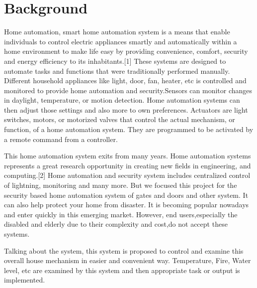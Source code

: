\documentclass[12pt,a4paper]{report}
\begin{document}
	\section{Background}
	
	\begin{justify}
		Home automation, smart home automation system is a means that enable individuals to control electric appliances smartly and automatically within a home environment to make life easy by providing convenience, comfort, security  and energy efficiency to its inhabitants.[1]   These systems are designed to automate tasks and functions that were traditionally performed manually. Different household appliances like light, door, fan, heater, etc is controlled and monitored to provide home automation and security.Sensors can monitor changes in daylight, temperature, or motion detection. Home automation systems can then adjust those settings and also more to own preferences. Actuators are light switches, motors, or motorized valves that control the actual mechanism, or function, of a home automation system. They are programmed to be activated by a remote command from a controller.
	\end{justify}
	\begin{justify}
		This home automation system exits from many years. Home automation systems represents a great research opportunity in creating new fields in engineering, and computing.[2] Home automation and security system includes centralized control of lightning, monitoring and many more. But we focused this project for the security based home automation system of gates and doors and other system. It can also help protect your home from disaster. It is becoming popular nowadays and enter quickly in this emerging market. However, end users,especially the disabled and elderly due to their complexity and cost,do not accept these systems.
		
	\end{justify}
	
	\begin{justify}
		Talking about the system, this system is proposed to control and examine this overall house mechanism in easier and convenient way. Temperature, Fire, Water level, etc are examined by this system and then appropriate task or output is implemented.
	\end{justify}
	
	
\end{document}
